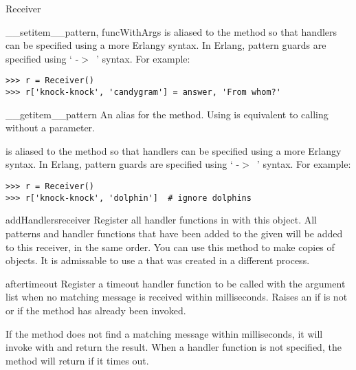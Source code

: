 \documentclass{howto}
\newcommand{\greaterthan}[0]{\begin{math}>\end{math}}
\newcommand{\greaterthan}[0]{>}
\begin{document}
\begin{classdesc}{Receiver}{}
\begin{methoddesc}{__setitem__}{pattern, funcWithArgs}
 is aliased to the  method so that
handlers can be specified using a more Erlangy syntax. In Erlang, pattern guards
are specified using ` -\greaterthan\ ' syntax. For
example:
\begin{verbatim}
>>> r = Receiver()
>>> r['knock-knock', 'candygram'] = answer, 'From whom?'
\end{verbatim}
\end{methoddesc}

\begin{methoddesc}{__getitem__}{pattern}
An alias for the  method. Using  is
equivalent to calling  without a  parameter.

 is aliased to the  method so that
handlers can be specified using a more Erlangy syntax. In Erlang, pattern guards
are specified using ` -\greaterthan\ ' syntax. For
example:
\begin{verbatim}
>>> r = Receiver()
>>> r['knock-knock', 'dolphin']  # ignore dolphins
\end{verbatim}
\end{methoddesc}

\begin{methoddesc}{addHandlers}{receiver}
Register all handler functions in  with this 
object. All patterns and handler functions that have been added to the given
 will be added to this receiver, in the same order. You can use
this method to make copies of  objects. It is admissable to
use a  that was created in a different process.
\end{methoddesc}

\begin{methoddesc}{after}{timeout}
Register a timeout handler function  to be called with the 
argument list when no matching message is received within 
milliseconds. Raises an  if  is not
 or if the  method has already been
invoked.

If the  method does not find a matching message within
 milliseconds, it will invoke  with  and return
the result. When a handler function  is not specified, the
 method will return  if it times out.


\end{methoddesc}
\end{classdesc}
\end{document}

